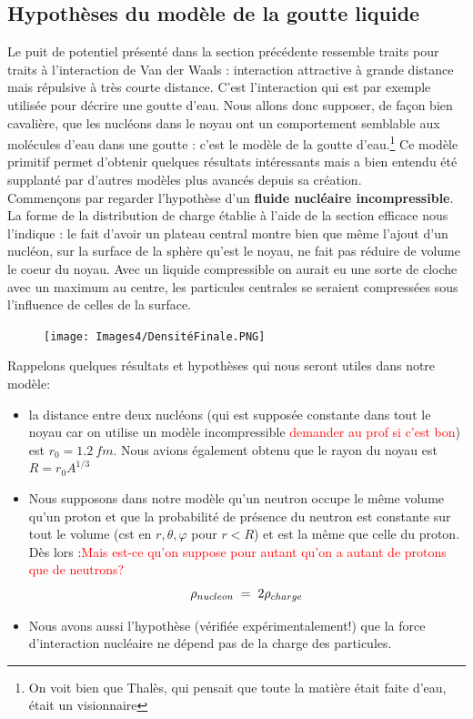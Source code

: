 \subsection{Hypothèses du modèle de la goutte liquide}


Le puit de potentiel présenté dans la section précédente ressemble traits pour traits à l'interaction de Van der Waals : interaction attractive à grande distance mais répulsive à très courte distance. C'est l'interaction qui est par exemple utilisée pour décrire une goutte d'eau. Nous allons donc supposer, de façon bien cavalière, que les nucléons dans le noyau ont un comportement semblable aux molécules d'eau dans une goutte : c'est le modèle de la goutte d'eau.\footnote{On voit bien que Thalès, qui pensait que toute la matière était faite d'eau, était un visionnaire} Ce modèle primitif permet d'obtenir quelques résultats intéressants mais a bien entendu été supplanté par d'autres modèles plus avancés depuis sa création.\\

Commençons par regarder l'hypothèse d'un \textbf{fluide nucléaire incompressible}. La forme de la distribution de charge établie à l'aide de la section efficace nous l'indique : le fait d'avoir un plateau central montre bien que même l'ajout d'un nucléon, sur la surface de la sphère qu'est le noyau, ne fait pas réduire de volume le coeur du noyau. Avec un liquide compressible on aurait eu une sorte de cloche avec un maximum au centre, les particules centrales se seraient compressées sous l'influence de celles de la surface.\\
\begin{figure}
    \centering
    \texttt{[image: Images4/DensitéFinale.PNG]}
\end{figure}
Rappelons quelques résultats et hypothèses qui nous seront utiles dans notre modèle:
\begin{itemize}
    \item la distance entre deux nucléons (qui est supposée constante dans tout le noyau car on utilise un modèle incompressible \textcolor{red}{demander au prof si c'est bon}) est $r_0 = \SI{1.2}{fm}$. Nous avions également obtenu que le rayon du noyau est $R=r_0A^{1/3}$

    \item Nous supposons dans notre modèle qu'un neutron occupe le même volume qu'un proton et que la probabilité de présence du neutron est constante sur tout le volume (cst en $r,\theta,\varphi$ pour $r<R$) et est la même que celle du proton. Dès lors :\textcolor{red}{Mais est-ce qu'on suppose pour autant qu'on a autant de protons que de neutrons?}
    $$ \rho_{nucleon} \; = \; 2 \rho_{charge} $$
    
    \item Nous avons aussi l'hypothèse (vérifiée expérimentalement!) que la force d'interaction nucléaire ne dépend pas de la charge des particules.
\end{itemize}


